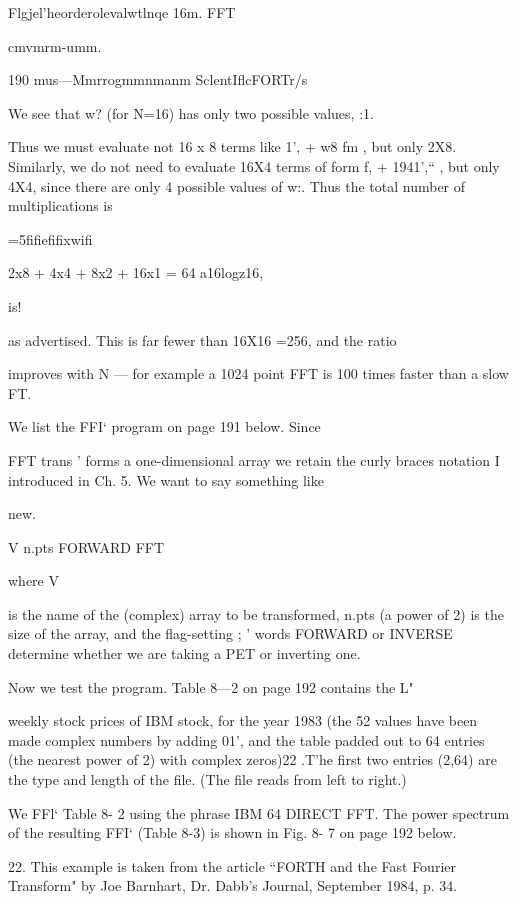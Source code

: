{{{{{{{{ 

 

Flgjel’heorderolevalwtlnqe 16m. FFT

cmvmrm-umm.

190 mus—Mmrrogmmnmanm SclentIﬂcFORTr/s

 
  

We see that w? (for N=16) has only two possible values, :1.

Thus we must evaluate not 16 x 8 terms like 1’, + w8 fm , but only
2X8. Similarly, we do not need to evaluate 16X4 terms of form
f, + 1941',“ , but only 4X4, since there are only 4 possible values
of w:. Thus the total number of multiplications is

=5ﬁﬁeﬁﬁxwiﬁ

2x8 + 4x4 + 8x2 + 16x1 = 64 a16logz16,

is!

as advertised. This is far fewer than 16X16 =256, and the ratio

improves with N — for example a 1024 point FFT is 100 times
faster than a slow FT.

We list the FFI‘ program on page 191 below. Since }FFT trans '
forms a one-dimensional array we retain the curly braces notation I
introduced in Ch. 5. We want to say something like

new.

V{ n.pts FORWARD }FFT

where V{ is the name of the (complex) array to be transformed,
n.pts (a power of 2) is the size of the array, and the ﬂag-setting ; '
words FORWARD or INVERSE determine whether we are
taking a PET or inverting one.

Now we test the program. Table 8—2 on page 192 contains the L"

weekly stock prices of IBM stock, for the year 1983 (the 52
values have been made complex numbers by adding 01', and the
table padded out to 64 entries (the nearest power of 2) with
complex zeros)22 .T'he ﬁrst two entries (2,64) are the type and
length of the ﬁle. (The ﬁle reads from left to right.)

We FFl‘ Table 8- 2 using the phrase IBM{ 64 DIRECT }FFT. The
power spectrum of the resulting FFI‘ (Table 8-3) is shown in
Fig. 8- 7 on page 192 below.

 

22. This example is taken from the article “FORTH and the Fast Fourier Transform" by Joe
Barnhart, Dr. Dabb's Journal, September 1984, p. 34.

 

}}}}}}}}
